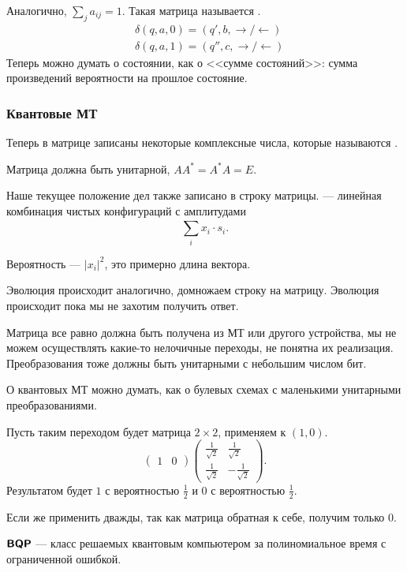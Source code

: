 Аналогично, $ \sum_{j}^{} a_{ij} = 1$.  Такая матрица называется .
\[
\begin{aligned}
	&\delta (q, a, 0) = (q', b , \to / \leftarrow  ) \\
	& \delta (q, a, 1) = (q'', c, \to / \leftarrow  )
\end{aligned}
\]
Теперь можно думать о состоянии, как о <<сумме состояний>>: сумма произведений вероятности на прошлое состояние. 

\subsubsection{Квантовые МТ}
Теперь в матрице записаны некоторые комплексные числа, которые называются . 

Матрица должна быть унитарной, $ A A^{*} = A^{*} A = E$. 

Наше текущее положение дел также записано в строку матрицы. 
 --- линейная комбинация чистых конфигураций с амплитудами
\[
\sum_{i}^{} x_i \cdot s_i
.\] 

Вероятность --- $ \lvert x_i \rvert ^2$, это примерно длина вектора.

Эволюция происходит аналогично, домножаем строку на матрицу.
Эволюция происходит пока мы не захотим получить ответ.

Матрица все равно должна быть получена из МТ или другого устройства, мы не можем осуществлять какие-то нелочичные переходы, не понятна их реализация.
Преобразования тоже должны быть унитарными с небольшим числом бит.

О квантовых МТ можно думать, как о булевых схемах с маленькими унитарными преобразованиями. 
\begin{ex}
	Пусть таким переходом будет матрица $ 2\times 2$, применяем к $ (1, 0)$. 
	\[
		\begin{pmatrix}
			1 & 0
		\end{pmatrix}
	\begin{pmatrix}
		\frac{1}{\sqrt{ 2} }& \frac{1}{\sqrt{ 2} }\\
		\frac{1}{\sqrt{ 2} }& -\frac{1}{\sqrt{ 2} }
	\end{pmatrix}
	.\] 
	Результатом будет $ 1$ с вероятностью $ \tfrac{1}{2}$ и $ 0$ с вероятностью $ \frac{1}{2}$.

	Если же применить дважды, так как матрица обратная к себе, получим только $ 0$.
\end{ex}

\begin{defn}\index{\BQP}
$ \textmd{\textbf{\textsf{BQP}}}$ --- класс решаемых квантовым компьютером за полиномиальное время  с ограниченной ошибкой.
\end{defn}

